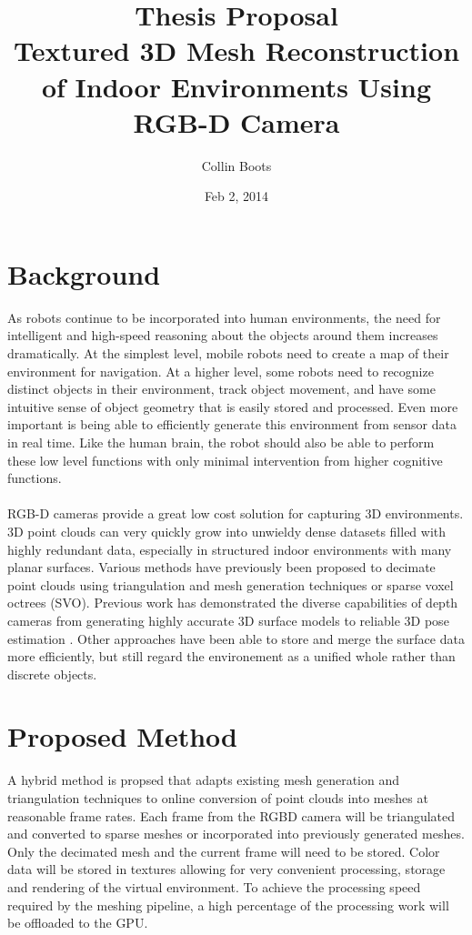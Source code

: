 \documentclass[english]{article}
\title{Thesis Proposal \\Textured 3D Mesh Reconstruction of Indoor Environments Using RGB-D Camera}
\author{Collin Boots}
\date{Feb 2, 2014}
\begin{document}
\maketitle
\section{Background}
As robots continue to be incorporated into human environments, the need for intelligent and high-speed reasoning about the objects around them increases dramatically. At the simplest level, mobile robots need to create a map of their environment for navigation. At a higher level, some robots need to recognize distinct objects in their environment, track object movement, and have some intuitive sense of object geometry that is easily stored and processed. Even more important is being able to efficiently generate this environment from sensor data in real time. Like the human brain, the robot should also be able to perform these low level functions with only minimal intervention from higher cognitive functions.\\
\\
RGB-D cameras provide a great low cost solution for capturing 3D environments. 3D point clouds can very quickly grow into unwieldy dense datasets filled with highly redundant data, especially in structured indoor environments with many planar surfaces. Various methods have previously been proposed to decimate point clouds using triangulation and mesh generation techniques or sparse voxel octrees (SVO). Previous work has demonstrated the diverse capabilities of depth cameras from generating highly accurate 3D surface models \cite{KinectFusion} to reliable 3D pose estimation \cite{Endres,Taguchi}. Other approaches have been able to store and merge the surface data more efficiently, but still regard the environement as a unified whole rather than discrete objects.

\section{Proposed Method}
A hybrid method is propsed that adapts existing mesh generation and triangulation techniques to online conversion of point clouds into meshes at reasonable frame rates. Each frame from the RGBD camera will be triangulated and converted to sparse meshes or incorporated into previously generated meshes. Only the decimated mesh and the current frame will need to be stored. Color data will be stored in textures allowing for very convenient processing, storage and rendering of the virtual environment. To achieve the processing speed required by the meshing pipeline, a high percentage of the processing work will be offloaded to the GPU.
\end{document}
